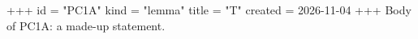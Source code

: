 +++
id = "PC1A"
kind = "lemma"
title = "T"
created = 2026-11-04
+++
Body of PC1A: a made-up statement.
